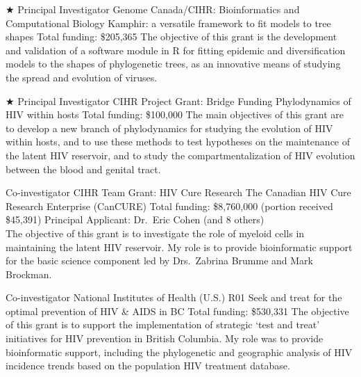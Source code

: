 {$\bigstar$ Principal Investigator}  %
{Genome Canada/CIHR: Bioinformatics and Computational Biology}
{Kamphir: a versatile framework to fit models to tree shapes}
{Total funding: \$205,365}
{
The objective of this grant is the development and validation of a software module in R for fitting epidemic and diversification models to the shapes of phylogenetic trees, as an innovative means of studying the spread and evolution of viruses.\\
}



{$\bigstar$ Principal Investigator}
{CIHR Project Grant: Bridge Funding}  %
{Phylodynamics of HIV within hosts}
{Total funding: \$100,000}
{
The main objectives of this grant are to develop a new branch of phylodynamics for studying the evolution of HIV within hosts, and to use these methods to test hypotheses on the maintenance of the latent HIV reservoir, and to study the compartmentalization of HIV evolution between the blood and genital tract.\\
}



{Co-investigator}
{CIHR Team Grant: HIV Cure Research}
{The Canadian HIV Cure Research Enterprise (CanCURE)}
{Total funding: \$8,760,000 (portion received \$45,391)}
{
Principal Applicant: Dr.~Eric Cohen (and 8 others)\\
The objective of this grant is to investigate the role of myeloid cells in maintaining the latent HIV reservoir.
My role is to provide bioinformatic support for the basic science component led by Drs.~Zabrina Brumme and Mark Brockman.\\
}

{Co-investigator}
{National Institutes of Health (U.S.) R01}
{Seek and treat for the optimal prevention of HIV \& AIDS in BC}
{Total funding: \$530,331}
{
The objective of this grant is to support the implementation of strategic `test and treat' initiatives for HIV prevention in British Columbia.
My role was to provide bioinformatic support, including the phylogenetic and geographic analysis of HIV incidence trends based on the population HIV treatment database.\\
}



